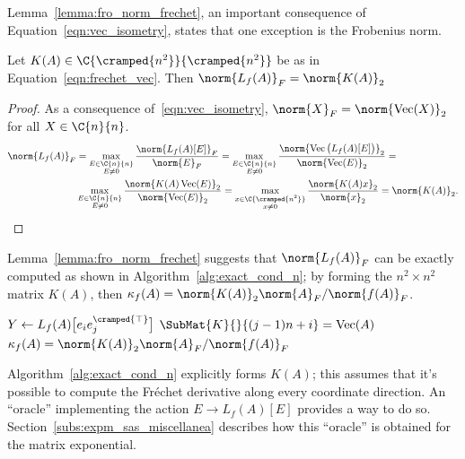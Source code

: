Lemma~\ref{lemma:fro_norm_frechet}, an important consequence of Equation~\eqref{eqn:vec_isometry}, states that one exception is the Frobenius norm. 
\begin{lemma}\label{lemma:fro_norm_frechet}
	Let $K(A)\in\C{\cramped{n^2}}{\cramped{n^2}}$ be as in Equation~\eqref{eqn:frechet_vec}. 
	Then $\norm{L_f(A)}_F=\norm{K(A)}_2$
\end{lemma}
\begin{proof}
	As a consequence of~\eqref{eqn:vec_isometry}, $\norm{X}_F=\norm{\operatorname{Vec}(X)}_2$
	for all $X\in\C{n}{n}$. 
	\begin{align*}
		\norm{L_f(A)}_F &= \max_{\substack{E\in\C{n}{n}\\ E\ne 0}}\frac{\norm{L_f(A)[E]}_F}{\norm{E}_F}=
		\max_{\substack{E\in\C{n}{n}\\ E\ne 0}}\frac{\norm{\operatorname{Vec}\big(L_f(A)[E]\big)}_2}{\norm{\operatorname{Vec}(E)}_2}=\\
		& \max_{\substack{E\in\C{n}{n}\\ E\ne 0}}\frac{\norm{K(A)\operatorname{Vec}(E)}_2}{\norm{\operatorname{Vec}(E)}_2}=
		\max_{\substack{x\in\C{\cramped{n^2}}\\ x\ne 0}}\frac{\norm{K(A)x}_2}{\norm{x}_2}=\norm{K(A)}_2.\qedhere
	\end{align*}
\end{proof}
Lemma~\ref{lemma:fro_norm_frechet} suggests that $\norm{L_f(A)}_F$ can be exactly computed as shown in Algorithm~\ref{alg:exact_cond_n}; by forming the $n^2\times n^2$ matrix $K(A)$, then $\kappa_f(A)=\norm{K(A)}_2\norm{A}_F/\norm{f(A)}_F$. 
\begin{algorithm}[H]
	\caption{\emph{Exact $\kappa_f(A)$ computation in the Frobenius norm~\cite[Alg.~3.17]{higham:matfun_book}}}
	\label{alg:exact_cond_n}
	\begin{algorithmic}[1]
				\State $Y \gets L_f(A)\big[e_{i}e_{j}^{\cramped{\top}}\big]$
				\State $\SubMat{K}{}{(j-1)n+i} = \operatorname{Vec}(A)$
			\EndFor
		\EndFor
		\State $\kappa_f(A) = \norm{K(A)}_2\norm{A}_F / \norm{f(A)}_F$
	\end{algorithmic}
\end{algorithm}
Algorithm~\ref{alg:exact_cond_n} explicitly forms $K(A)$; this assumes that it's possible to compute the Fréchet derivative along every coordinate direction. An ``oracle'' implementing the action $E\to L_f(A)[E]$ provides a way to do so.
Section~\ref{subs:expm_sas_miscellanea} describes how this ``oracle'' is obtained for the matrix exponential.

